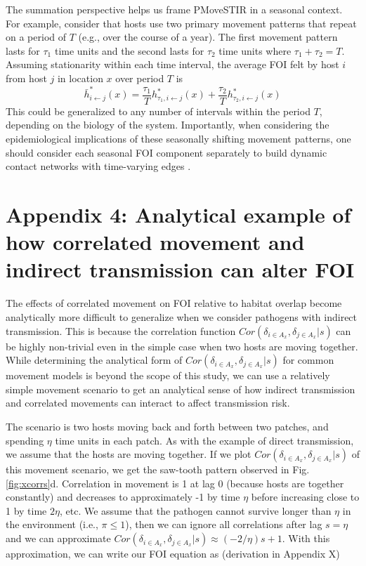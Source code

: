 \documentclass[letterpaper]{article}
\begin{document}
The summation perspective helps us frame PMoveSTIR in a seasonal context.  For example, consider that hosts use two primary movement patterns that repeat on a period of $T$ (e.g., over the course of a year).  The first movement pattern lasts for $\tau_1$ time units and the second lasts for $\tau_2$ time units where $\tau_1 + \tau_2 = T$.  Assuming stationarity within each time interval, the average FOI felt by host $i$ from host $j$ in location $x$ over period $T$ is 
\begin{equation}
\bar{h}^*_{i \leftarrow j}(x) = \frac{\tau_1}{T} h^*_{\tau_1, i \leftarrow j}(x) + \frac{\tau_2}{T} h^*_{\tau_2, i \leftarrow j}(x)
\label{eq:seasonal}
\end{equation}
This could be generalized to any number of intervals within the period $T$, depending on the biology of the system.  Importantly, when considering the epidemiological implications of these seasonally shifting movement patterns, one should consider each seasonal FOI component separately to build dynamic contact networks with time-varying edges \citep{Wilber2022}.


\section*{Appendix 4: Analytical example of how correlated movement and indirect transmission can alter FOI}

The effects of correlated movement on FOI relative to habitat overlap become analytically more difficult to generalize when we consider pathogens with indirect transmission.  This is because the correlation function $Cor(\delta_{i \in A_x}, \delta_{j \in A_x} | s)$ can be highly non-trivial even in the simple case when two hosts are moving together.  
While determining the analytical form of $Cor(\delta_{i \in A_x}, \delta_{j \in A_x} | s)$ for common movement models is beyond the scope of this study, we can use a relatively simple movement scenario to get an analytical sense of how indirect transmission and correlated movements can interact to affect transmission risk.

The scenario is two hosts moving back and forth between two patches, and spending $\eta$ time units in each patch.  As with the example of direct transmission, we assume that the hosts are moving together. If we plot $Cor(\delta_{i \in A_x}, \delta_{j \in A_x} | s)$ of this movement scenario, we get the saw-tooth pattern observed in Fig. \ref{fig:xcorrs}d.  
Correlation in movement is 1 at lag 0 (because hosts are together constantly) and decreases to approximately -1 by time $\eta$ before increasing close to 1 by time $2\eta$, etc. 
We assume that the pathogen cannot survive longer than $\eta$ in the environment (i.e., $\pi \leq 1$), then we can ignore all correlations after lag $s = \eta$ and we can approximate $Cor(\delta_{i \in A_x}, \delta_{j \in A_x} | s) \approx (-2 / \eta)s + 1$.  With this approximation, we can write our FOI equation as (derivation in Appendix X)
\end{document}
